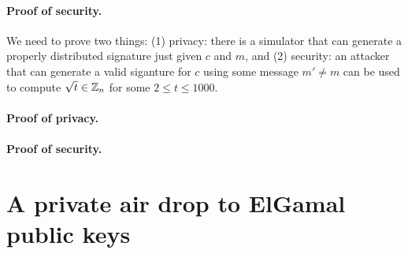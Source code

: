\documentclass[11pt]{article}
\begin{document}
\paragraph{Proof of security.}
We need to prove two things: 
(1) privacy: there is a simulator that can generate a properly distributed
signature just given $c$ and $m$, and 
(2) security: an attacker that can generate a valid siganture for $c$ using
some message $m' \neq m$ can be used to compute $\sqrt{t} \in \mathbb Z_n$
for some $2 \leq t \leq 1000$. 

\paragraph{Proof of privacy.}


\paragraph{Proof of security.}
 


\section{A private air drop to ElGamal public keys}





\end{document}
